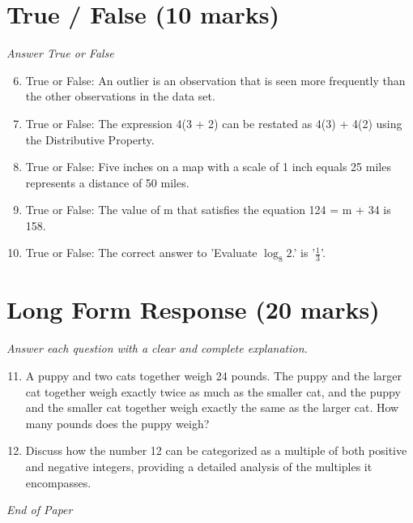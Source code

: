 \documentclass[12pt]{article}
\begin{document}
\section*{True / False (10 marks)}
\textit{Answer True or False}
\begin{enumerate}[label=\arabic*.]
\setcounter{enumi}{5}
\item True or False: An outlier is an observation that is seen more frequently than the other observations in the data set.
\item True or False: The expression 4(3 + 2) can be restated as 4(3) + 4(2) using the Distributive Property.
\item True or False: Five inches on a map with a scale of 1 inch equals 25 miles represents a distance of 50 miles.
\item True or False: The value of m that satisfies the equation 124 = m + 34 is 158.
\item True or False: The correct answer to 'Evaluate $\log_8 2$.' is '\ensuremath{\frac{1}{3}}'.
\end{enumerate}

\section*{Long Form Response (20 marks)}
\textit{Answer each question with a clear and complete explanation.}
\begin{enumerate}[label=\arabic*.]
\setcounter{enumi}{10}
\item A puppy and two cats together weigh 24 pounds. The puppy and the larger cat together weigh
exactly twice as much as the smaller cat, and the puppy and the smaller cat together weigh
exactly the same as the larger cat. How many pounds does the puppy weigh?
\item Discuss how the number 12 can be categorized as a multiple of both positive and negative
integers, providing a detailed analysis of the multiples it encompasses.
\end{enumerate}

\vfill
\noindent\textit{End of Paper}
\end{document}

